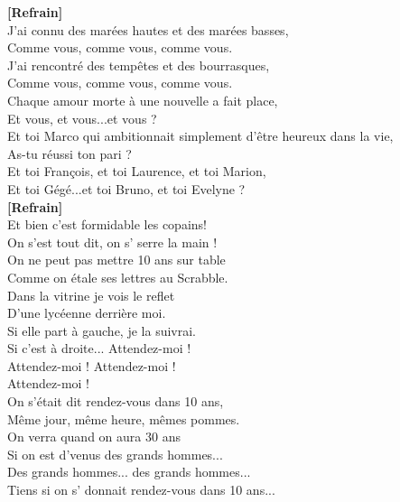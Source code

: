 \documentclass{novel}
\begin{document}
\begin{multicols}{2}
\textbf{[Refrain]} \\

J'ai connu des marées hautes et des marées basses, \\
Comme vous, comme vous, comme vous. \\
J'ai rencontré des tempêtes et des bourrasques, \\
Comme vous, comme vous, comme vous. \\
Chaque amour morte à une nouvelle a fait place, \\
Et vous, et vous...et vous ? \\
Et toi Marco qui ambitionnait simplement d'être heureux dans la vie, \\
As-tu réussi ton pari ? \\
Et toi François, et toi Laurence, et toi Marion, \\
Et toi Gégé...et toi Bruno, et toi Evelyne ? \\

\textbf{[Refrain]} \\

Et bien c'est formidable les copains! \\
On s'est tout dit, on s' serre la main ! \\
On ne peut pas mettre 10 ans sur table \\
Comme on étale ses lettres au Scrabble. \\
Dans la vitrine je vois le reflet \\

D'une lycéenne derrière moi. \\
Si elle part à gauche, je la suivrai. \\
Si c'est à droite... Attendez-moi ! \\
Attendez-moi ! Attendez-moi ! \\
Attendez-moi ! \\

On s'était dit rendez-vous dans 10 ans, \\
Même jour, même heure, mêmes pommes. \\
On verra quand on aura 30 ans \\
Si on est d'venus des grands hommes... \\
Des grands hommes... des grands hommes... \\
Tiens si on s' donnait rendez-vous dans 10 ans... \\

\end{multicols}

\newpage
\small
\end{document}
